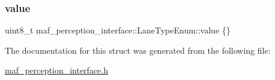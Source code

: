 \subsubsection{\texorpdfstring{value}{value}}
{\footnotesize\ttfamily uint8\+\_\+t maf\+\_\+perception\+\_\+interface\+::\+Lane\+Type\+Enum\+::value \{\}}



The documentation for this struct was generated from the following file\+:\begin{DoxyCompactItemize}
\item 
\hyperlink{maf__perception__interface_8h}{maf\+\_\+perception\+\_\+interface.\+h}\end{DoxyCompactItemize}
